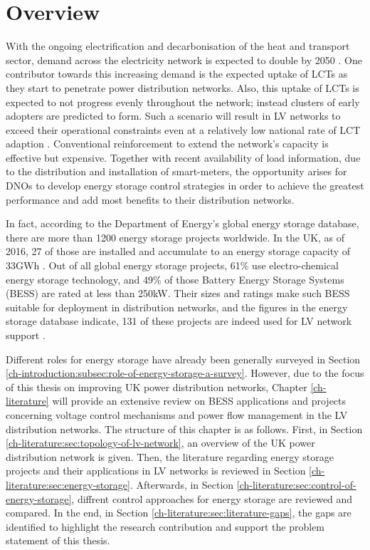 \section{Overview}
\label{ch-literature:sec:overview}

With the ongoing electrification and decarbonisation of the heat and transport sector, demand across the electricity network is expected to double by 2050 \cite{Wilks2010}.
One contributor towards this increasing demand is the expected uptake of LCTs as they start to penetrate power distribution networks.
Also, this uptake of LCTs is expected to not progress evenly throughout the network; instead clusters of early adopters are predicted to form.
Such a scenario will result in LV networks to exceed their operational constraints even at a relatively low national rate of LCT adaption \cite{Poghosyan2014}.
Conventional reinforcement to extend the network's capacity is effective but expensive.
Together with recent availability of load information, due to the distribution and installation of smart-meters, the opportunity arises for DNOs to develop energy storage control strategies in order to achieve the greatest performance and add most benefits to their distribution networks.

In fact, according to the Department of Energy's global energy storage database, there are more than 1200 energy storage projects worldwide.
In the UK, as of 2016, 27 of those are installed and accumulate to an energy storage capacity of 33GWh \cite{Garton2016}.
Out of all global energy storage projects, 61\% use electro-chemical energy storage technology, and 49\% of those Battery Energy Storage Systems (BESS) are rated at less than 250kW.
Their sizes and ratings make such BESS suitable for deployment in distribution networks, and the figures in the energy storage database indicate, 131 of these projects are indeed used for LV network support \cite{DOE-GESD}.

Different roles for energy storage have already been generally surveyed in Section \ref{ch-introduction:subsec:role-of-energy-storage-a-survey}.
However, due to the focus of this thesis on improving UK power distribution networks, Chapter \ref{ch-literature} will provide an extensive review on BESS applications and projects concerning voltage control mechanisms and power flow management in the LV distribution networks.
The structure of this chapter is as follows.
First, in Section \ref{ch-literature:sec:topology-of-lv-network}, an overview of the UK power distribution network is given.
Then, the literature regarding energy storage projects and their applications in LV networks is reviewed in Section \ref{ch-literature:sec:energy-storage}.
Afterwards, in Section \ref{ch-literature:sec:control-of-energy-storage}, diffrent control approaches for energy storage are reviewed and compared.
In the end, in Section \ref{ch-literature:sec:literature-gaps}, the gaps are identified to highlight the research contribution and support the problem statement of this thesis.
